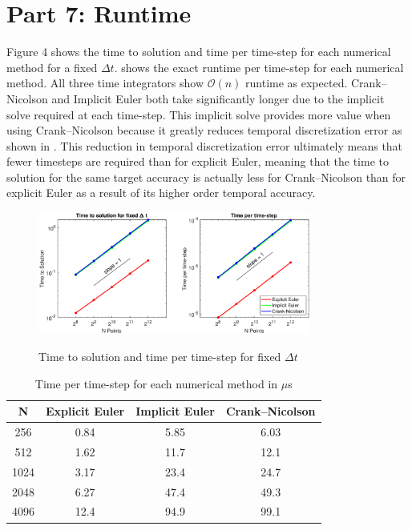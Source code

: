 \documentclass[reqno, 12pt]{amsart}
\begin{document}
    \section*{Part 7: Runtime}
    \noindent Figure 4 shows the time to solution and time per time-step for each numerical method for a fixed $\Delta t$.
     shows the exact runtime per time-step for each numerical method.
    All three time integrators show $\mathcal{O}(n)$ runtime as expected.
    Crank--Nicolson and Implicit Euler both take significantly longer due to the implicit solve required at each time-step.
    This implicit solve provides more value when using Crank--Nicolson because it greatly reduces temporal discretization error as shown in .
    This reduction in temporal discretization error ultimately means that fewer timesteps are required than for explicit Euler, meaning that the time to solution for the same target accuracy is actually less for Crank--Nicolson than for explicit Euler as a result of its higher order temporal accuracy.
    \begin{figure}
        \centering
            \includegraphics[width=0.8\textwidth]{P7.eps}
            \label{fig:runtime}
            \caption{Time to solution and time per time-step for fixed $\Delta t$}
    \end{figure}
    \begin{table}
        \caption{Time per time-step for each numerical method in $\mu$s}
        \begin{tabular}{ c | c c c}
            \hline N & Explicit Euler & Implicit Euler & Crank--Nicolson \\ \hline
            256 & 0.84 & 5.85 & 6.03 \\
            512 & 1.62 & 11.7 & 12.1\\
            1024 & 3.17 & 23.4 & 24.7\\
            2048 & 6.27 & 47.4 & 49.3\\
            4096 & 12.4 & 94.9 & 99.1\\ \hline
        \end{tabular}
        \label{tab:runtime}
    \end{table}
\end{document}

